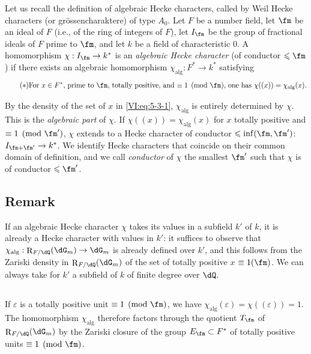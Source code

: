 \documentclass[oneside]{book}
\DeclareMathOperator{\res}{R} %
\newcounter{char}
\theoremstyle{sga-source}
\theoremstyle{sga-source-dash}
\theoremstyle{sga-source-dotdash}
\theoremstyle{sga-source-number-note-dash}
\theoremstyle{sga-source-note-number-dotdash}
\theoremstyle{sga-source-example-dotdash}
\theoremstyle{sga-source-inline-number}
\theoremstyle{sga-source-bare-number}
\theoremstyle{sga-source}
\newcommand{\PrintPage}[1]{}\newcommand{\MathPage}[1]{}\newcommand{\PrintCite}[2]{#1}\newcommand{\var}[3]{#2}
\begin{document}
Let us recall the definition of algebraic Hecke characters, called by Weil 
Hecke characters (or gr\"ossencharaktere) of type $A_0$. Let $F$ be 
a number field, let $\fm$ be an ideal of $F$ (i.e., of the ring of integers of 
$F$), let $I_\fm$ be the group of fractional ideals of $F$ prime to $\fm$, 
and let $k$ be a field of characteristic $0$. A homomorphism 
$\chi:I_\fm \to k^\ast$ is an \emph{algebraic Hecke character} (of 
conductor $\leqslant \fm$) if there exists an algebraic homomorphism 
$\chi_\text{alg}:F^\ast \to k^\ast$ satisfying 
\begin{equation*}\tag{$*$}\label{VI:eq:5-3-1}
\text{For $x\in F^\ast$, prime to $\fm$, totally positive, and 
$\equiv 1\pmod\fm$, one has $\chi((x))=\chi_\text{alg}(x)$.}
\end{equation*}

By the density of the set of $x$ in \eqref{VI:eq:5-3-1}, $\chi_\text{alg}$ 
is entirely determined by $\chi$. This is the \emph{algebraic part} 
of $\chi$. If $\chi((x))=\chi_\text{alg}(x)$ for $x$ totally positive and 
$\equiv 1\pmod{\fm'}$, $\chi$ extends to a Hecke character of 
conductor $\leqslant \inf(\fm,\fm')$: $I_{\fm+\fm'}\to k^\ast$. We 
identify Hecke characters that coincide on their common domain of 
definition, and we call \emph{conductor} of $\chi$ the smallest $\fm'$ 
such that $\chi$ is of conductor $\leqslant \fm'$. 





\PrintPage{210}
\subsection{Remark}\label{VI:5-4}

If an algebraic Hecke character $\chi$ takes its values in a 
subfield $k'$ of $k$, it is already a Hecke character with values in 
$k'$: it suffices to observe that $\chi_\text{alg}:\res_{F/\dQ}(\dG_m) \to \dG_m$ 
is already defined over $k'$, and this follows from the Zariski density 
in $\res_{F/\dQ}(\dG_m)$ of the set of totally positive $x$ 
$\equiv 1(\fm)$. We can always take for $k'$ a subfield of $k$ of 
finite degree over $\dQ$. 





\subsection{}\label{VI:5-5}

If $\varepsilon$ is a totally positive unit $\equiv 1\pmod\fm$, we have 
$\chi_\text{alg}(\varepsilon) = \chi((\varepsilon)) = 1$. The homomorphism 
$\chi_\text{alg}$ therefore factors through the quotient $T_\fm$ of 
$\res_{F/\dQ}(\dG_m)$ by the Zariski closure of the group 
$E_\fm\subset F^\ast$ of totally positive units $\equiv 1\pmod\fm$. 
\end{document}

